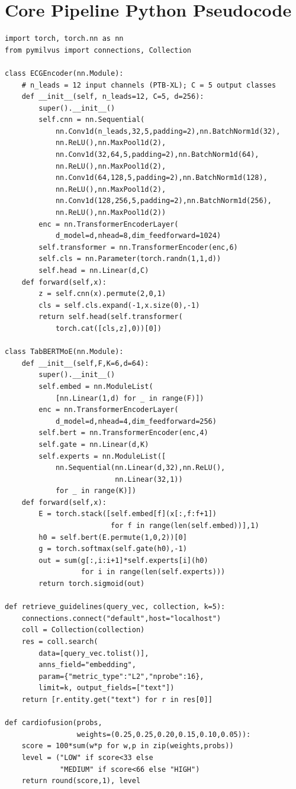 \documentclass[AMA,STIX1COL,]{WileyNJD-v2}
\begin{document}
\appendix
\section{Core Pipeline Python Pseudocode}

\begin{lstlisting}[caption={DeepCardio-RAG v3.0 -- Core Pipeline}]
import torch, torch.nn as nn
from pymilvus import connections, Collection

class ECGEncoder(nn.Module):
    # n_leads = 12 input channels (PTB-XL); C = 5 output classes
    def __init__(self, n_leads=12, C=5, d=256):
        super().__init__()
        self.cnn = nn.Sequential(
            nn.Conv1d(n_leads,32,5,padding=2),nn.BatchNorm1d(32),
            nn.ReLU(),nn.MaxPool1d(2),
            nn.Conv1d(32,64,5,padding=2),nn.BatchNorm1d(64),
            nn.ReLU(),nn.MaxPool1d(2),
            nn.Conv1d(64,128,5,padding=2),nn.BatchNorm1d(128),
            nn.ReLU(),nn.MaxPool1d(2),
            nn.Conv1d(128,256,5,padding=2),nn.BatchNorm1d(256),
            nn.ReLU(),nn.MaxPool1d(2))
        enc = nn.TransformerEncoderLayer(
            d_model=d,nhead=8,dim_feedforward=1024)
        self.transformer = nn.TransformerEncoder(enc,6)
        self.cls = nn.Parameter(torch.randn(1,1,d))
        self.head = nn.Linear(d,C)
    def forward(self,x):
        z = self.cnn(x).permute(2,0,1)
        cls = self.cls.expand(-1,x.size(0),-1)
        return self.head(self.transformer(
            torch.cat([cls,z],0))[0])

class TabBERTMoE(nn.Module):
    def __init__(self,F,K=6,d=64):
        super().__init__()
        self.embed = nn.ModuleList(
            [nn.Linear(1,d) for _ in range(F)])
        enc = nn.TransformerEncoderLayer(
            d_model=d,nhead=4,dim_feedforward=256)
        self.bert = nn.TransformerEncoder(enc,4)
        self.gate = nn.Linear(d,K)
        self.experts = nn.ModuleList([
            nn.Sequential(nn.Linear(d,32),nn.ReLU(),
                          nn.Linear(32,1))
            for _ in range(K)])
    def forward(self,x):
        E = torch.stack([self.embed[f](x[:,f:f+1])
                         for f in range(len(self.embed))],1)
        h0 = self.bert(E.permute(1,0,2))[0]
        g = torch.softmax(self.gate(h0),-1)
        out = sum(g[:,i:i+1]*self.experts[i](h0)
                  for i in range(len(self.experts)))
        return torch.sigmoid(out)

def retrieve_guidelines(query_vec, collection, k=5):
    connections.connect("default",host="localhost")
    coll = Collection(collection)
    res = coll.search(
        data=[query_vec.tolist()],
        anns_field="embedding",
        param={"metric_type":"L2","nprobe":16},
        limit=k, output_fields=["text"])
    return [r.entity.get("text") for r in res[0]]

def cardiofusion(probs,
                 weights=(0.25,0.25,0.20,0.15,0.10,0.05)):
    score = 100*sum(w*p for w,p in zip(weights,probs))
    level = ("LOW" if score<33 else
             "MEDIUM" if score<66 else "HIGH")
    return round(score,1), level
\end{lstlisting}
\end{document}
